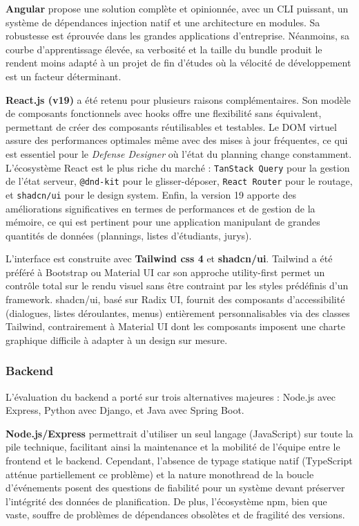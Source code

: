 \textbf{Angular} propose une solution complète et opinionnée, avec un CLI puissant, un système de dépendances injection natif et une architecture en modules. Sa robustesse est éprouvée dans les grandes applications d'entreprise. Néanmoins, sa courbe d'apprentissage élevée, sa verbosité et la taille du bundle produit le rendent moins adapté à un projet de fin d'études où la vélocité de développement est un facteur déterminant.

\textbf{React.js (v19)} a été retenu pour plusieurs raisons complémentaires. Son modèle de composants fonctionnels avec hooks offre une flexibilité sans équivalent, permettant de créer des composants réutilisables et testables. Le DOM virtuel assure des performances optimales même avec des mises à jour fréquentes, ce qui est essentiel pour le \textit{Defense Designer} où l'état du planning change constamment. L'écosystème React est le plus riche du marché : \texttt{TanStack Query} pour la gestion de l'état serveur, \texttt{@dnd-kit} pour le glisser-déposer, \texttt{React Router} pour le routage, et \texttt{shadcn/ui} pour le design system. Enfin, la version 19 apporte des améliorations significatives en termes de performances et de gestion de la mémoire, ce qui est pertinent pour une application manipulant de grandes quantités de données (plannings, listes d'étudiants, jurys).

L'interface est construite avec \textbf{Tailwind \gls{css} 4} et \textbf{shadcn/ui}. Tailwind a été préféré à Bootstrap ou Material UI car son approche utility-first permet un contrôle total sur le rendu visuel sans être contraint par les styles prédéfinis d'un framework. shadcn/ui, basé sur Radix UI, fournit des composants d'accessibilité (dialogues, listes déroulantes, menus) entièrement personnalisables via des classes Tailwind, contrairement à Material UI dont les composants imposent une charte graphique difficile à adapter à un design sur mesure.

\subsubsection{Backend}
\label{ch2:backend}

L'évaluation du backend a porté sur trois alternatives majeures : Node.js avec Express, Python avec Django, et Java avec Spring Boot.

\textbf{Node.js/Express} permettrait d'utiliser un seul langage (JavaScript) sur toute la pile technique, facilitant ainsi la maintenance et la mobilité de l'équipe entre le frontend et le backend. Cependant, l'absence de typage statique natif (TypeScript atténue partiellement ce problème) et la nature monothread de la boucle d'événements posent des questions de fiabilité pour un système devant préserver l'intégrité des données de planification. De plus, l'écosystème npm, bien que vaste, souffre de problèmes de dépendances obsolètes et de fragilité des versions.

